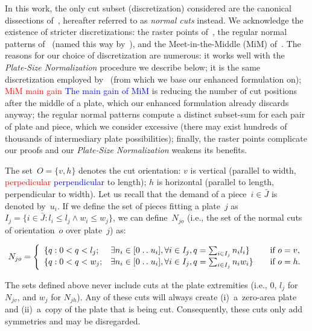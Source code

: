 \documentclass[smallextended]{svjour3}       %
\newif\iffinalversion
\newcommand{\newtext}[1]{\iffinalversion%
#1%
\else%
\textcolor{blue}{#1}%
\fi%
}
\newcommand{\oldtext}[1]{\iffinalversion%
#1%
\else%
\textcolor{red}{#1}%
\fi%
}
\newcommand{\isep}{\mathrel{{.}\,{.}}\nobreak} %
\begin{document}
In this work, the only cut subset (discretization) considered are the canonical dissections of~\cite{herz:1972}, hereafter referred to as \emph{normal cuts} instead.
We acknowledge the existence of stricter discretizations: the raster points of~\cite{terno:1987,guntram:1966}, the regular normal patterns of~\cite{boschetti:2002} (named this way by~\cite{cote:2018}), and the Meet-in-the-Middle (MiM) of~\cite{cote:2018}.
The reasons for our choice of discretization are numerous:
it works well with the \emph{Plate-Size Normalization} procedure we describe below;
it is the same discretization employed by~\cite{furini:2016} (from which we base our enhanced formulation on);
\oldtext{MiM main gain}\newtext{The main gain of MiM} is reducing the number of cut positions after the middle of a plate, which our enhanced formulation already discards anyway;
the regular normal patterns compute a distinct subset-sum for each pair of plate and piece, which we consider excessive (there may exist hundreds of thousands of intermediary plate possibilities);
finally, the raster points complicate our proofs and our \emph{Plate-Size Normalization} weakens its benefits.

The set~\(O = \{v, h\}\) denotes the cut orientation: \(v\) is vertical (parallel to width, \oldtext{perpedicular}\newtext{perpendicular} to length); \(h\) is horizontal (parallel to length, perpendicular to width).
Let us recall that the demand of a piece~\(i \in \bar{J}\) is denoted by~\(u_i\).
If we define the set of pieces fitting a plate~\(j\) as~\(I_j = \{i \in \bar{J} : l_i \leq l_j \land w_i \leq w_j \}\), we can define~\(N_{jo}\) (i.e., the set of the normal cuts of orientation~\(o\) over plate~\(j\)) as:

{\iffinalversion\else\color{blue}\fi
\begin{equation}
N_{jo}= \left\{
\begin{array}{lllr}
  \{q: 0 < q < l_j; & \exists n_i \in [0 \isep u_i], \forall i \in I_j, q = \sum_{i\in I_j} n_i l_i \} & \quad \text{if } o = v,\\
  \{q: 0 < q < w_j; & \exists n_i \in [0 \isep u_i], \forall i \in I_j, q = \sum_{i\in I_j} n_i w_i \} & \quad \text{if } o = h.
\end{array}\right.
\end{equation}
}

The sets defined above never include cuts at the plate extremities (i.e., \(0\), \(l_j\) for \(N_{jv}\), and \(w_j\) for \(N_{jh}\)).
Any of these cuts will always create (i)~a~zero-area plate and (ii)~a~copy of the plate that is being cut.
Consequently, these cuts only add symmetries and may be disregarded.
\end{document}
